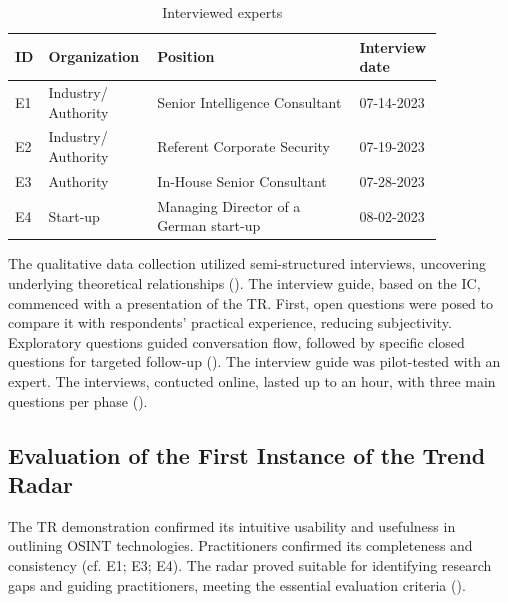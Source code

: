 \documentclass[10pt]{article}
\begin{document}
\begin{table}[hbtp]
    \caption{Interviewed experts}
    \begin{tabular}{p{0.05\linewidth}p{0.2\linewidth}p{0.45\linewidth}p{0.15\linewidth}}
        \toprule
        \textbf{ID} & \textbf{Organization} & \textbf{Position}                      & \textbf{Interview date} \\
        \hline
        E1          & Industry/ Authority   & Senior Intelligence Consultant         & 07-14-2023              \\
        \hline
        E2          & Industry/ Authority   & Referent Corporate Security            & 07-19-2023              \\
        \hline
        E3          & Authority             & In-House Senior Consultant             & 07-28-2023              \\
        \hline
        E4          & Start-up              & Managing Director of a German start-up & 08-02-2023              \\
        \bottomrule
    \end{tabular}
    \label{tab:experts}
\end{table}
The qualitative data collection utilized semi-structured interviews, uncovering underlying theoretical relationships (\cite{Bogner.2014}). The interview guide, based on the IC, commenced with a presentation of the TR. First, open questions were posed to compare it with respondents' practical experience, reducing subjectivity. Exploratory questions guided conversation flow, followed by specific closed questions for targeted follow-up (\cite{Saunders.2012}). The interview guide was pilot-tested with an expert. The interviews, contucted online, lasted up to an hour, with three main questions per phase (\cite{Bogner.2014}).

\subsection{Evaluation of the First Instance of the Trend Radar}

The TR demonstration confirmed its intuitive usability and usefulness in outlining OSINT technologies. %
Practitioners confirmed its completeness and consistency (cf. E1; E3; E4). The radar proved suitable for identifying research gaps and guiding practitioners, meeting the essential evaluation criteria (\cite{Sonnenberg.2012}).
\end{document}
